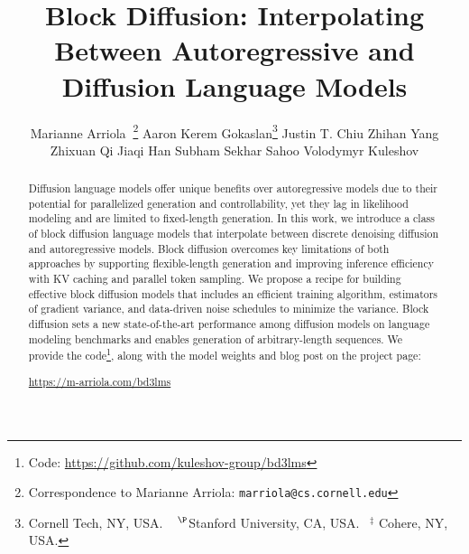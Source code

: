 \documentclass{article} %
\title{Block Diffusion: Interpolating Between Autoregressive and Diffusion Language Models}
\author{%
  Marianne Arriola\footnotemark[2]$\;\;$\thanks{Correspondence to Marianne Arriola: \texttt{marriola@cs.cornell.edu}} \And 
  Aaron Kerem Gokaslan\thanks{Cornell Tech, NY, USA. $\;\;\;^\P$Stanford University, CA, USA.$\;\;\;^\ddag$ Cohere, NY, USA.} \And 
  Justin T. Chiu\footnotemark[3] \And 
  Zhihan Yang\footnotemark[2] \And 
  Zhixuan Qi\footnotemark[2] \And 
  Jiaqi Han\footnotemark[5] \And 
 Subham Sekhar Sahoo\footnotemark[2] \And 
  Volodymyr Kuleshov\footnotemark[2]
}
\def\algos{BD3-LMs}
\begin{document}
\maketitle

\begin{abstract}
Diffusion language models offer unique benefits over autoregressive models due to their potential for parallelized generation and controllability, yet they lag in likelihood modeling and are limited to fixed-length generation. In this work, we introduce a class of block diffusion language models that interpolate between discrete denoising diffusion and autoregressive models. Block diffusion overcomes key limitations of both approaches by supporting flexible-length generation and improving inference efficiency with KV caching and parallel token sampling. We propose a recipe for building effective block diffusion models that includes an efficient training algorithm, estimators of gradient variance, and data-driven noise schedules to minimize the variance. Block diffusion sets a new state-of-the-art performance among diffusion models on language modeling benchmarks and enables generation of arbitrary-length sequences. We provide the code\footnote{Code: \href{https://github.com/kuleshov-group/bd3lms}{https://github.com/kuleshov-group/bd3lms}}, along with the model weights and blog post on the project page:


\vspace{0.3ex}

\centerline{\href{https://mariannearr.github.io/bd3lms/}{https://m-arriola.com/bd3lms}}
\end{abstract}
\end{document}
